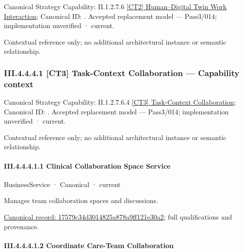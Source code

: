 {\small Canonical Strategy Capability: II.1.2.7.6 \hyperref[element:8bcaa906b67443019e75ffd13af64c9c]{[CT2] Human–Digital Twin Work Interaction}; Canonical ID: \texttt{}. Accepted replacement model — Pass3/014; implementation unverified · current.}\par
Contextual reference only; no additional architectural instance or semantic relationship.\par
\subsubsection*{III.4.4.4.1 [CT3] Task-Context Collaboration — Capability context}
\label{navigation:III.4.4.4.1}

{\small Canonical Strategy Capability: II.1.2.7.6.4 \hyperref[element:0ce2d4475d9e4fee8296f9101a6aa2af]{[CT3] Task-Context Collaboration}; Canonical ID: \texttt{}. Accepted replacement model — Pass3/014; implementation unverified · current.}\par
Contextual reference only; no additional architectural instance or semantic relationship.\par
\paragraph*{III.4.4.4.1.1 Clinical Collaboration Space Service}
\label{navigation:III.4.4.4.1.1}

\label{element:17579c34d3014825a878a9ff121e30a2}
{\small BusinessService · Canonical · current}\par

Manages team collaboration spaces and discussions.


{\footnotesize \href{../../../../../../../../continuum/business/business-service/17579c34d3014825a878a9ff121e30a2.md}{Canonical record: 17579c34d3014825a878a9ff121e30a2}; full qualifications and provenance.}\par
\paragraph*{III.4.4.4.1.2 Coordinate Care-Team Collaboration}
\label{navigation:III.4.4.4.1.2}

